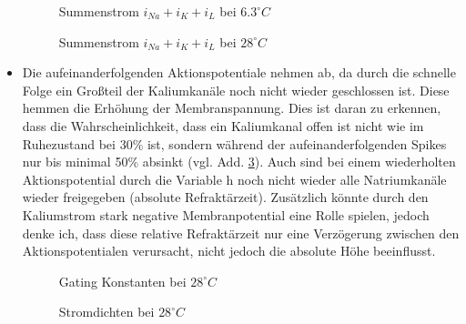 \documentclass[conference]{IEEEtran}
\begin{document}
\begin{itemize}
\begin{figure}[h!]
  	\centering
    \scalebox{.6}{}
    \caption{Summenstrom $i_{Na}+i_K+i_L$ bei $6.3^\circ C$}
    \label{fig:Summenstrom6}
\end{figure}
\begin{figure}[h!]
  	\centering
    \scalebox{.6}{}
    \caption{Summenstrom $i_{Na}+i_K+i_L$ bei $28^\circ C$}
    \label{fig:Summenstrom28}
\end{figure}



\item Die aufeinanderfolgenden Aktionspotentiale nehmen ab, da durch die schnelle Folge ein Großteil der Kaliumkanäle noch nicht wieder geschlossen ist. Diese hemmen die Erhöhung der Membranspannung. Dies ist daran zu erkennen, dass die Wahrscheinlichkeit, dass ein Kaliumkanal offen ist nicht wie im Ruhezustand bei 30\% ist, sondern während der aufeinanderfolgenden Spikes nur bis minimal 50\% absinkt (vgl. Add. \ref{fig:GatingClose28}). Auch sind bei einem wiederholten Aktionspotential durch die Variable h noch nicht wieder alle Natriumkanäle wieder freigegeben (absolute Refraktärzeit). Zusätzlich könnte durch den Kaliumstrom stark negative Membranpotential eine Rolle spielen, jedoch denke ich, dass diese relative Refraktärzeit nur eine Verzögerung zwischen den Aktionspotentialen verursacht, nicht jedoch die absolute Höhe beeinflusst.
\begin{figure}[h!]
  	\centering
    \scalebox{.6}{}
    \caption{Gating Konstanten bei $28^\circ C$}
    \label{fig:GatingClose28}
\end{figure}
\begin{figure}[h!]
  	\centering
    \scalebox{.6}{}
    \caption{Stromdichten bei $28^\circ C$}
    \label{fig:StromdichtenClose28}
\end{figure}




\end{itemize}
\end{document}
